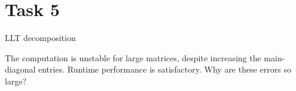 \section{Task 5}
LLT decomposition

\begin{center}
\end{center}

\noindent
The computation is unstable for large matrices, despite increasing the main-diagonal entries. Runtime performance is satisfactory. Why are these errors so large?
